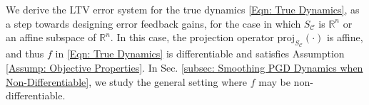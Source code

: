 \documentclass[letterpaper, 10 pt, conference]{ieeeconf}
\newcommand{\C}{\mathcal{C}}
\newcommand{\R}{\mathbb{R}}
\newcommand{\?}{\stackrel{?}{=}}
\newcommand{\param}{\theta}
\newcommand{\paramSet}{\Theta}
\newcommand{\var}{\xi}
\newcommand{\varDim}{n}
\newcommand{\convergenceRadius}{\beta}
\newcommand{\ratePGD}{\alpha}
\newcommand{\ratePGDMin}{c_\ratePGD}
\newcommand{\ratePGDMax}{C_\ratePGD}
\newcommand{\proj}{\text{proj}}
\newcommand{\constraintSet}{{S_{\mathcal{C}}}}
\newcommand{\dynamicsFullState}{f}
\newcommand{\frank}[1]{{\textcolor[rgb]{0,0,1}{\textsf{[Frank: {#1}]}}}}
\newcommand{\antoine}[1]{{\textcolor[rgb]{1,0,0}{\textsf{[Antoine: {#1}]}}}}
\begin{document}

We
derive the LTV error system for the true dynamics \eqref{Eqn: True Dynamics},
as a step towards designing error feedback gains,
for the case in which $\constraintSet$ is $\R^\varDim$ or an affine subspace of $\R^\varDim$.
In this case, the projection operator $\proj_\constraintSet(\cdot)$ is affine, 
and thus $\dynamicsFullState$ in \eqref{Eqn: True Dynamics}
is differentiable and satisfies
Assumption \ref{Assump: Objective Properties}.
In Sec. \ref{subsec: Smoothing PGD Dynamics when Non-Differentiable}, we study the general setting where $\dynamicsFullState$ may be non-differentiable.
\end{document}
